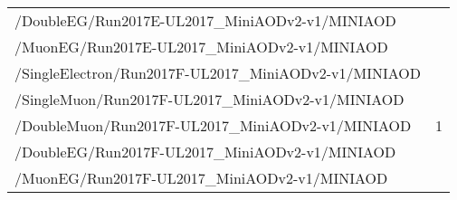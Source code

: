 \begin{table}[h]
\begin{tabular}{|lc|}
        /DoubleEG/Run2017E-UL2017\_MiniAODv2-v1/MINIAOD	& \\
        /MuonEG/Run2017E-UL2017\_MiniAODv2-v1/MINIAOD	& \\
        \hline
        /SingleElectron/Run2017F-UL2017\_MiniAODv2-v1/MINIAOD & \multirow{5}{*}{1} \\ %
        /SingleMuon/Run2017F-UL2017\_MiniAODv2-v1/MINIAOD	& \\
        /DoubleMuon/Run2017F-UL2017\_MiniAODv2-v1/MINIAOD	& \\
        /DoubleEG/Run2017F-UL2017\_MiniAODv2-v1/MINIAOD	& \\
        /MuonEG/Run2017F-UL2017\_MiniAODv2-v1/MINIAOD	& \\
        \hline	
		\end{tabular}
	\label{table:2017_dataSamples}
\end{table}
